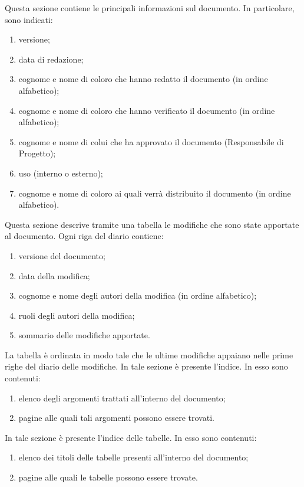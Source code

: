 					Questa sezione contiene le principali informazioni sul documento. In particolare, sono indicati:
					\begin{enumerate}
						\item versione;
						\item data di redazione;
						\item cognome e nome di coloro che hanno redatto il documento (in ordine alfabetico);
						\item cognome e nome di coloro che hanno verificato il documento (in ordine alfabetico);
						\item cognome e nome di colui che ha approvato il documento (Responsabile di Progetto);
						\item uso (interno o esterno);
						\item cognome e nome di coloro ai quali verrà distribuito il documento (in ordine alfabetico).
					\end{enumerate}
					Questa sezione descrive tramite una tabella le modifiche che sono state apportate al documento. Ogni riga del diario contiene:
					\begin{enumerate}
						\item versione del documento;
						\item data della modifica;
						\item cognome e nome degli autori della modifica (in ordine alfabetico);
						\item ruoli degli autori della modifica;
						\item sommario delle modifiche apportate.
					\end{enumerate}
					La tabella è ordinata in modo tale che le ultime modifiche appaiano nelle prime righe del diario delle modifiche.
					In tale sezione è presente l’indice. In esso sono contenuti:
					\begin{enumerate}
						\item elenco degli argomenti trattati all’interno del documento;
						\item pagine alle quali tali argomenti possono essere trovati.
					\end{enumerate}
					In tale sezione è presente l’indice delle tabelle. In esso sono contenuti:
					\begin{enumerate}
						\item elenco dei titoli delle tabelle presenti all’interno del documento;
						\item pagine alle quali le tabelle possono essere trovate.
					\end{enumerate}
